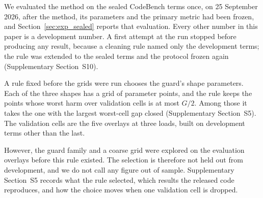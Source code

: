 We evaluated the method on the sealed CodeBench terms once, on 25 September 2026, after the
method, its parameters and the primary metric had been frozen, and
Section~\ref{sec:exp_sealed} reports that evaluation. Every other number in this paper is a development number. A first attempt at
the run stopped before producing any result, because a cleaning rule named only the
development terms; the rule was extended to the sealed terms and the protocol frozen again
(Supplementary Section~S10).

A rule fixed before the grids were run chooses the guard's shape parameters. Each of the
three shapes has a grid of parameter points, and the rule keeps the points whose worst harm
over  validation cells is at most $G/2$. Among those it takes the one with the
largest worst-cell gap closed (Supplementary Section~S5). The validation cells are the five
overlays at three loads, built on development terms other than the last.

However, the guard family and a coarse grid were explored on the evaluation overlays before
this rule existed. The selection is therefore not held out from development, and we do not
call any figure out of sample. Supplementary Section~S5 records what the rule selected,
which results the released code reproduces, and how the choice moves when one validation
cell is dropped.

